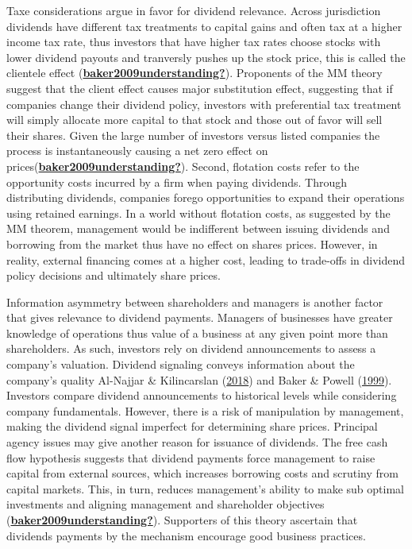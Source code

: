 \documentclass[11pt,preprint, authoryear]{elsarticle}
\numberwithin{equation}{section}
\numberwithin{figure}{section}
\numberwithin{table}{section}
\begin{document}
Taxe considerations argue in favor for dividend relevance. Across
jurisdiction dividends have different tax treatments to capital gains
and often tax at a higher income tax rate, thus investors that have
higher tax rates choose stocks with lower dividend payouts and
tranversly pushes up the stock price, this is called the clientele
effect
(\protect\hyperlink{ref-baker2009understanding}{\textbf{baker2009understanding?}}).
Proponents of the MM theory suggest that the client effect causes major
substitution effect, suggesting that if companies change their dividend
policy, investors with preferential tax treatment will simply allocate
more capital to that stock and those out of favor will sell their
shares. Given the large number of investors versus listed companies the
process is instantaneously causing a net zero effect on
prices(\protect\hyperlink{ref-baker2009understanding}{\textbf{baker2009understanding?}}).
Second, flotation costs refer to the opportunity costs incurred by a
firm when paying dividends. Through distributing dividends, companies
forego opportunities to expand their operations using retained earnings.
In a world without flotation costs, as suggested by the MM theorem,
management would be indifferent between issuing dividends and borrowing
from the market thus have no effect on shares prices. However, in
reality, external financing comes at a higher cost, leading to
trade-offs in dividend policy decisions and ultimately share prices.

Information asymmetry between shareholders and managers is another
factor that gives relevance to dividend payments. Managers of businesses
have greater knowledge of operations thus value of a business at any
given point more than shareholders. As such, investors rely on dividend
announcements to assess a company's valuation. Dividend signaling
conveys information about the company's quality Al-Najjar \&
Kilincarslan (\protect\hyperlink{ref-al2018revisiting}{2018}) and Baker
\& Powell (\protect\hyperlink{ref-baker1999corporate}{1999}). Investors
compare dividend announcements to historical levels while considering
company fundamentals. However, there is a risk of manipulation by
management, making the dividend signal imperfect for determining share
prices. Principal agency issues may give another reason for issuance of
dividends. The free cash flow hypothesis suggests that dividend payments
force management to raise capital from external sources, which increases
borrowing costs and scrutiny from capital markets. This, in turn,
reduces management's ability to make sub optimal investments and
aligning management and shareholder objectives
(\protect\hyperlink{ref-baker2009understanding}{\textbf{baker2009understanding?}}).
Supporters of this theory ascertain that dividends payments by the
mechanism encourage good business practices.
\end{document}
